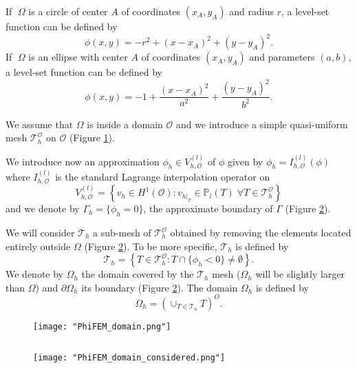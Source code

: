 \begin{Example}
	If $\; \Omega$ is a circle of center $A$ of coordinates $(x_A,y_A)$ and radius $r$, a level-set function can be defined by
	\begin{equation*}
		\phi(x,y)=-r^2+(x-x_A)^2+(y-y_A)^2.
	\end{equation*}
	If $\; \Omega$ is an ellipse with center $A$ of coordinates $(x_A,y_A)$ and parameters $(a,b)$, a level-set function can be defined by
	\begin{equation*}
		\phi(x,y)=-1+\frac{(x-x_A)^2}{a^2}+\frac{(y-y_A)^2}{b^2}.
	\end{equation*}
\end{Example}

We assume that $\Omega$ is inside a domain $\mathcal{O}$ and we introduce a simple quasi-uniform mesh $\mathcal{T}_h^\mathcal{O}$ on $\mathcal{O}$ (Figure \ref{space2}).
 
We introduce now an approximation $\phi_h\in V_{h,\mathcal{O}}^{(l)}$ of $\phi$ given by $\phi_h=I_{h,\mathcal{O}}^{(l)}(\phi)$ where $I_{h,\mathcal{O}}^{(l)}$ is the standard Lagrange interpolation operator on
\begin{equation*}
	V_{h,\mathcal{O}}^{(l)}=\left\{v_h\in H^1(\mathcal{O}):v_{h|_T}\in\mathbb{P}_l(T) \;  \forall T\in\mathcal{T}_h^\mathcal{O}\right\}
\end{equation*}
and we denote by $\Gamma_h=\{\phi_h=0\}$, the approximate boundary of $\Gamma$ (Figure \ref{space3}).

We will consider $\mathcal{T}_h$ a sub-mesh of $\mathcal{T}_h^\mathcal{O}$ obtained by removing the elements located entirely outside $\Omega$ (Figure \ref{space3}). To be more specific, $\mathcal{T}_h$ is defined by
\begin{equation*}
	\mathcal{T}_h=\left\{T\in \mathcal{T}_h^\mathcal{O}:T\cap\{\phi_h<0\}\ne\emptyset\right\}.
\end{equation*}
We denote by $\Omega_h$ the domain covered by the $\mathcal{T}_h$ mesh ($\Omega_h$ will be slightly larger than $\Omega$) and $\partial\Omega_h$ its boundary (Figure \ref{space3}). The domain $\Omega_h$ is defined by
\begin{equation*}
	\Omega_h=\left(\cup_{T\in\mathcal{T}_h}T\right)^O.
\end{equation*}

\begin{minipage}{0.52\linewidth}
	\begin{figure}[H]
		\centering
		\texttt{[image: "PhiFEM\_domain.png"]}
		\label{space2}
	\end{figure}
\end{minipage} $\qquad$
\begin{minipage}{0.44\linewidth}
	\begin{figure}[H]
		\centering
		\texttt{[image: "PhiFEM\_domain\_considered.png"]}
		\label{space3}
	\end{figure}
\end{minipage}

